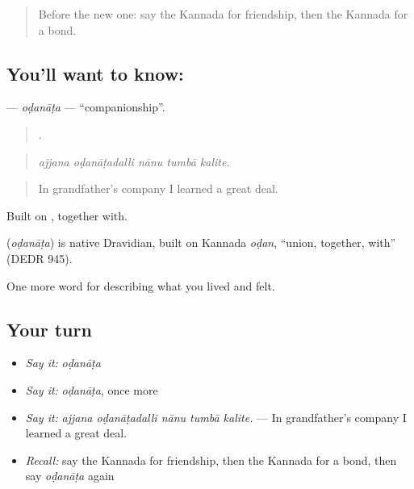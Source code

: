 \label{lesson:KA-C528-odanata}



\begin{quote}
Before the new one: say the Kannada for friendship, then the Kannada for a bond.
\end{quote}

\subsection*{You'll want to know: }
\textbf{} — \emph{oḍanāṭa} — \textquotedblleft{}companionship\textquotedblright{}.

\begin{quote}
    .
\end{quote}

\begin{quote}
\emph{ajjana oḍanāṭadalli nānu tumbā kalite.}
\end{quote}

\begin{quote}
In grandfather's company I learned a great deal.
\end{quote}

Built on , together with.

\begin{cousinweb}
\textbf{} (\emph{oḍanāṭa}) is native Dravidian, built on Kannada \emph{oḍan}, \textquotedblleft{}union, together, with\textquotedblright{} (DEDR 945).
\end{cousinweb}

\begin{grammarlens}[title={What you've built}]
One more word for describing what you lived and felt.
\end{grammarlens}

\subsection*{Your turn}
\begin{itemize}
\raggedright
  \item \emph{Say it:} \emph{oḍanāṭa}
  \item \emph{Say it:} \emph{oḍanāṭa}, once more
  \item \emph{Say it:} \emph{ajjana oḍanāṭadalli nānu tumbā kalite.} — In grandfather's company I learned a great deal.
  \item \emph{Recall:} say the Kannada for friendship, then the Kannada for a bond, then say \emph{oḍanāṭa} again
\end{itemize}

